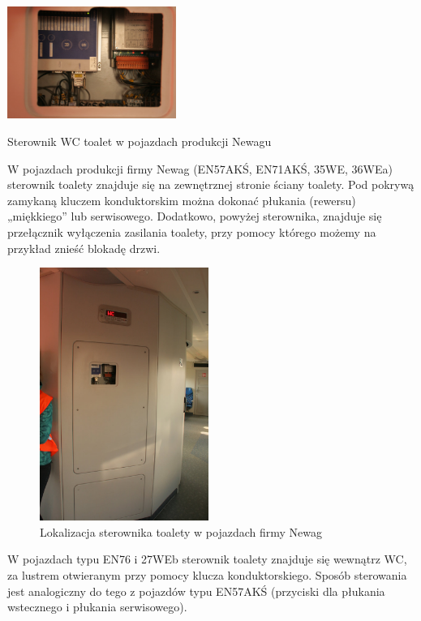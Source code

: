 \begin{marginfigure}
	\includegraphics[width=5.5cm]{skryptkierownik-img/skryptkierownik-img057.jpg}
	\caption{Sterownik WC toalet w pojazdach produkcji Newagu}
\end{marginfigure}
W pojazdach produkcji firmy Newag (EN57AKŚ, EN71AKŚ, 35WE, 36WEa) sterownik toalety znajduje się na zewnętrznej stronie ściany toalety. Pod pokrywą zamykaną kluczem konduktorskim można dokonać płukania (rewersu) „miękkiego” lub serwisowego. Dodatkowo, powyżej sterownika, znajduje się przełącznik wyłączenia zasilania toalety, przy pomocy którego możemy na przykład znieść blokadę drzwi.

\begin{figure}
	\includegraphics[width=5.5cm]{skryptkierownik-img/skryptkierownik-img058.jpg}
	\caption{Lokalizacja sterownika toalety w pojazdach firmy Newag}
\end{figure}

W pojazdach typu EN76 i 27WEb sterownik toalety znajduje się wewnątrz WC, za lustrem otwieranym przy pomocy klucza konduktorskiego. Sposób sterowania jest analogiczny do tego z pojazdów typu EN57AKŚ (przyciski dla płukania wstecznego i płukania serwisowego).


